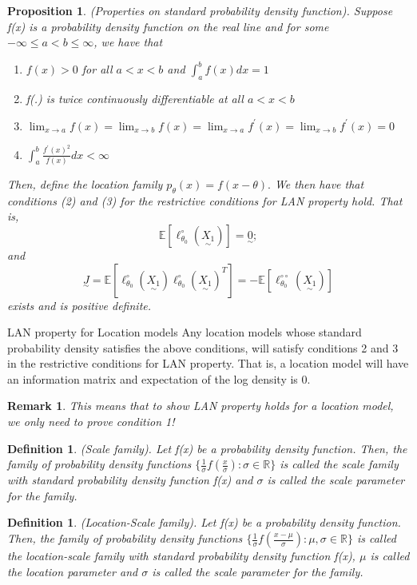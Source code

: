 \documentclass[twoside]{article}
\newtheorem{proposition}[theorem]{Proposition}
\newtheorem{definition}[theorem]{Definition}
\newtheorem{remark}[theorem]{Remark}
\newcommand{\utilde}{\underset{\sim}}
\begin{document}
\begin{proposition}(Properties on standard probability density function). Suppose f(x) is a probability density function on the real line and for some $-\infty \leq a < b \leq \infty$, we have that 
\begin{enumerate}
\item $f(x) > 0$ for all $a < x < b$ and $\int_{a}^{b}f(x)dx = 1$
\item f(.) is twice continuously differentiable at all $a < x < b$
\item $\lim_{x \rightarrow a}f(x) = \lim_{x \rightarrow b}f(x) = \lim_{x \rightarrow a}f^{'}(x) = \lim_{x \rightarrow b}f^{'}(x) = 0$
\item $\int_{a}^{b}\frac{f^{'}(x)^2}{f(x)}dx < \infty$
\end{enumerate}
Then, define the location family $p_{\theta}(x) = f(x - \theta).$ We then have that conditions (2) and (3) for the restrictive conditions for LAN property hold. That is, 
$$
\mathbb{E}[\ell_{\theta_{0}}^{\circ}(\utilde{X_1})] = \utilde{0};
$$
and 
$$
\utilde{J} = \mathbb{E}[\ell_{\theta_{0}}^{\circ}(\utilde{X_1})\ell_{\theta_{0}}^{\circ}(\utilde{X_1})^T] = -\mathbb{E}[\ell_{\theta_{0}}^{\circ \circ}(\utilde{X_1})]
$$
exists and is positive definite.
\end{proposition}



\begin{proposition_exam}{LAN property for Location models}{} Any location models whose standard probability density satisfies the above conditions, will satisfy conditions 2 and 3 in the restrictive conditions for LAN property. That is, a location model will have an information matrix and expectation of the log density is 0.
\end{proposition_exam}
\begin{remark}This means that to show LAN property holds for a location model, we only need to prove condition 1!
\end{remark}


\begin{definition}(Scale family). Let f(x) be a probability density function. Then, the family of probability density functions $\{\frac{1}{\sigma}f(\frac{x}{\sigma}): \sigma \in \mathbb{R}\}$ is called the scale family with standard probability density function f(x) and $\sigma$ is called the scale parameter for the family.
\end{definition}

\begin{definition}(Location-Scale family). Let f(x) be a probability density function. Then, the family of probability density functions $\{\frac{1}{\sigma}f(\frac{x - \mu}{\sigma}): \mu, \sigma \in \mathbb{R}\}$ is called the location-scale family with standard probability density function f(x), $\mu$ is called the location parameter and $\sigma$ is called the scale parameter for the family.
\end{definition}
\end{document}
